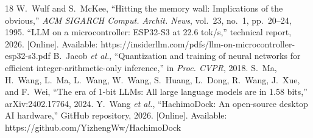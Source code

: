 \documentclass[journal,letterpaper]{IEEEtran}
\begin{document}
\begin{thebibliography}{18}
 W.~Wulf and S.~McKee, ``Hitting the memory wall: Implications of the obvious,'' \emph{ACM SIGARCH Comput. Archit. News}, vol.~23, no.~1, pp.~20--24, 1995.
 ``LLM on a microcontroller: ESP32-S3 at 22.6 tok/s,'' technical report, 2026. [Online]. Available: https://insiderllm.com/pdfs/llm-on-microcontroller-esp32-s3.pdf
 B.~Jacob \emph{et al.}, ``Quantization and training of neural networks for efficient integer-arithmetic-only inference,'' in \emph{Proc. CVPR}, 2018.
 S.~Ma, H.~Wang, L.~Ma, L.~Wang, W.~Wang, S.~Huang, L.~Dong, R.~Wang, J.~Xue, and F.~Wei, ``The era of 1-bit LLMs: All large language models are in 1.58 bits,'' arXiv:2402.17764, 2024.
 Y.~Wang \emph{et al.}, ``HachimoDock: An open-source desktop AI hardware,'' GitHub repository, 2026. [Online]. Available: https://github.com/YizhengWw/HachimoDock
\end{thebibliography}
\end{document}
